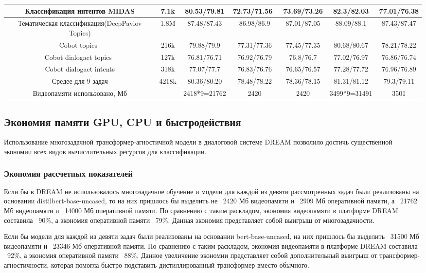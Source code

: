 \begin{table}[htbp]
{\begin{tabular}{|c||c|c|c|c|c|c|}
Классификация интентов MIDAS          & 7.1k & 80.53/79.81 & 72.73/71.56~ & 73.69/73.26 & 82.3/82.03  & 77.01/76.38 \\ \hline
Тематическая классификация(DeepPavlov Topics) & 1.8M & 87.48/87.43 & 86.98/86.9  & 87.01/87.05         & 88.09/88.1  & 87.43/87.47 \\ \hline
Cobot topics~                  & 216k & 79.88/79.9  & 77.31/77.36 & 77.45/77.35         & 80.68/80.67 & 78.21/78.22 \\ \hline
Cobot dialogact topics~             & 127k & 76.81/76.71 & 76.92/76.79 & 76.8/76.7          & 77.02/76.97 & 76.86/76.74 \\ \hline
Cobot dialogact intents             & 318k & 77.07/77.7  & 76.83/76.76 & 76.65/76.57         & 77.28/77.72 & 76.96/76.89 \\ \hline
Средее для 9 задач                   & 4218k & 80.36/80.20    & 78.48/78.22 & 78.36/78.15         & 81.31/81.12  & 79.3/79.11 \\ \hline
Видеопамяти использовано, Мб               &    & 2418*9=21762 & 2420     & 2420             & 3499*9=31491 & 3501    \\ \hline
\end{tabular}
}
\end{table}

\subsection{Экономия памяти GPU, CPU и быстродействия} 
\label{economy}
Использование многозадачной трансформер-агностичной модели в диалоговой системе {DREAM} позволило достичь существенной экономии всех видов вычислительных ресурсов для классификации.
\subsubsection{Экономия рассчетных показателей} 
\label{economy_predicted} 
 Если бы в {DREAM} не использовалось многозадачное обучение и модели для каждой из девяти рассмотренных задач были реализованы на основании distilbert-base-uncased, то на них пришлось бы выделить не ~2420 Мб видеопамяти и ~2909 Мб оперативной памяти, а ~21762 Мб видеопамяти и ~14000 Мб оперативной памяти. По сравнению с таким раскладом, экономия видеопамяти в платформе {DREAM} составила ~90\%, а экономия оперативной памяти ~79\%. Данная экономия представляет собой выигрыш от многозадачности.

Если бы модели для каждой из девяти задач были реализованы на основании bert-base-uncased, на них пришлось бы выделить ~31500 Мб видеопамяти и ~23346 Мб оперативной памяти. По сравнению с таким раскладом, экономия видеопамяти в платформе {DREAM} составила ~92\%, а экономия оперативной памяти ~88\%. Данное увеличение экономии представляет собой дополнительный выигрыш от трансформер-агностичности, которая помогла быстро подставить дистиллированный трансформер вместо обычного.

